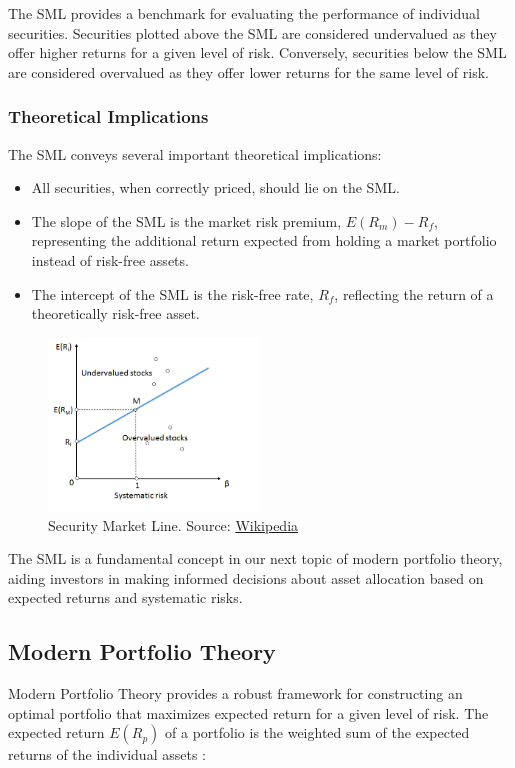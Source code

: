 The SML provides a benchmark for evaluating the performance of individual securities. Securities plotted above the SML are considered undervalued as they offer higher returns for a given level of risk. Conversely, securities below the SML are considered overvalued as they offer lower returns for the same level of risk.

\subsubsection{Theoretical Implications}
The SML conveys several important theoretical implications:
\begin{itemize}
    \item All securities, when correctly priced, should lie on the SML.
    \item The slope of the SML is the market risk premium, \( E(R_m) - R_f \), representing the additional return expected from holding a market portfolio instead of risk-free assets.
    \item The intercept of the SML is the risk-free rate, \( R_f \), reflecting the return of a theoretically risk-free asset.
\end{itemize}

\begin{figure}[h]
\centering
\includegraphics[width=0.5\textwidth]{SML.png} 
\caption{Security Market Line. Source: \href{https://en.wikipedia.org/wiki/Security_market_line}{Wikipedia}}
\label{fig:sml}
\end{figure}

The SML is a fundamental concept in our next topic of modern portfolio theory, aiding investors in making informed decisions about asset allocation based on expected returns and systematic risks.

\subsection{Modern Portfolio Theory}
Modern Portfolio Theory provides a robust framework for constructing an optimal portfolio that maximizes expected return for a given level of risk. The expected return \( E(R_p) \) of a portfolio is the weighted sum of the expected returns of the individual assets \citep{markowitz1952portfolio}:

